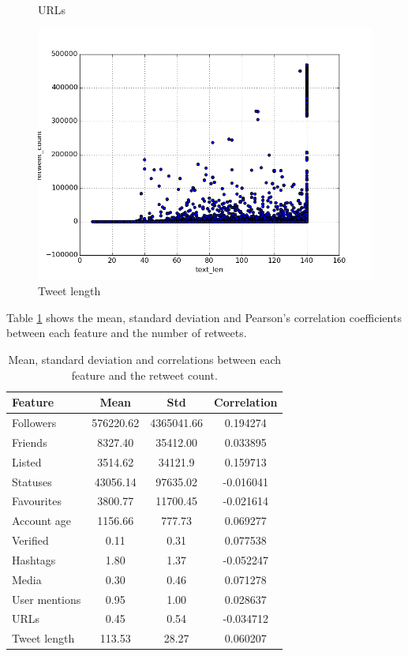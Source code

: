 \begin{figure}[H]
    \caption{URLs}
\endminipage\hfill
{}
    \centering
    \includegraphics[width=\linewidth]{img/text_len.png}
    \caption{Tweet length}
\endminipage\hfill
\end{figure}

Table \ref{tab:corel} shows the mean, standard deviation and Pearson's correlation coefficients between each feature and the number of retweets.

\begin{table}[h]
\centering
\begin{tabular}{ l | c  | c |c }
\textbf{Feature} & \textbf{Mean}  & \textbf{Std} & \textbf{Correlation} \\\hline
Followers & 576220.62 & 4365041.66 & 0.194274  \\
Friends & 8327.40 & 35412.00 &  0.033895  \\
Listed & 3514.62 &  34121.9 & 0.159713  \\
Statuses  & 43056.14 & 97635.02 & -0.016041  \\
Favourites & 3800.77 & 11700.45 & -0.021614  \\
Account age &  1156.66 & 777.73 & 0.069277  \\
Verified &  0.11 & 0.31 & 0.077538  \\
Hashtags & 1.80 & 1.37 & -0.052247  \\
Media & 0.30 & 0.46 & 0.071278  \\
User mentions &  0.95 & 1.00 & 0.028637  \\
URLs &  0.45 & 0.54 & -0.034712  \\
Tweet length & 113.53 & 28.27 & 0.060207 
\end{tabular}
\caption{Mean, standard deviation and correlations between each feature and the retweet count.}
\label{tab:corel}
\end{table}



